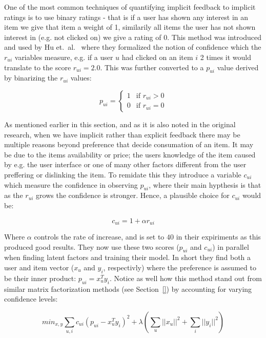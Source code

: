 One of the most common techniques of quantifying implicit feedback to implicit
ratings is to use binary ratings - that is if a user has shown any interest in
an item we give that item a weight of 1, similarily all items the user has not
shown interest in (e.g. not clicked on) we give a rating of 0. This method was
introduced and used by Hu et.\ al.~\cite{Hu2008} where they formalized the
notion of confidence which the $r_{ui}$ variables measure, e.g. if a user $u$
had clicked on an item $i$ 2 times it would translate to the score $r_{ui} =
2.0$. This was further converted to a $p_{ui}$ value derived by binarizing the
$r_{ui}$ values:

\begin{equation}
  p_{ui} =
  \begin{cases}
    1 & \text{if $r_{ui} > 0$} \\
    0 & \text{if $r_{ui} = 0$}
  \end{cases}
\end{equation}

As mentioned earlier in this section, and as it is also noted in the original
research, when we have implicit rather than explicit feedback there may be
multiple reasons beyond preference that decide consumation of an item. It may
be due to the items availability or price; the users knowledge of the item
caused by e.g. the user interface or one of many other factors different from
the user preffering or dislinking the item. To remidate this they introduce a
variable $c_{ui}$ which measure the confidence in observing $p_{ui}$, where
their main hypthesis is that as the $r_{ui}$ grows the confidence is stronger.
Hence, a plausible choice for $c_{ui}$ would be:

\begin{equation}
c_{ui} = 1 + \alpha r_{ui}
\end{equation}

Where $\alpha$ controls the rate of increase, and is set to $40$ in their
expiriments as this produced good results. They now use these two scores
($p_{ui}$ and $c_{ui}$) in parallel when finding latent factors and training
their model. In short they find both a user and item vector ($x_u$ and $y_i$,
respectivly) where the preference is assumed to be their inner product: $p_{ui}
= x_{u}^{T} y_{i}$. Notice as well how this method stand out from similar
matrix factorization methods (see Section~\ref{}) by accounting for varying
confidence levels:

\begin{equation}
  min_{x,y} \sum _{u,i} c_{ui} (p_{ui} - x_{u}^{T} y_i)^2 + \lambda (\sum _{u}
  || x_u ||^2 + \sum_{i} || y_i ||^2)
\end{equation}


